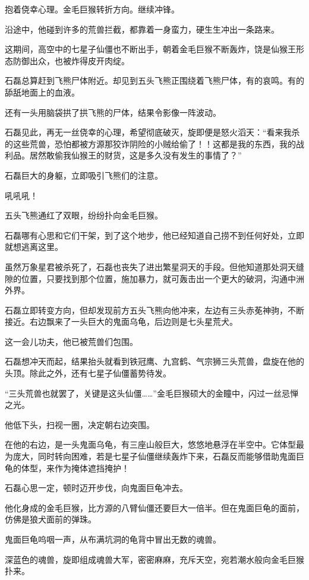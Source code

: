 \begin{this_body}
抱着侥幸心理。金毛巨猴转折方向。继续冲锋。

沿途中，他碰到许多的荒兽拦截，都靠着一身蛮力，硬生生冲出一条路来。

这期间，高空中的七星子仙僵也不断出手，朝着金毛巨猴不断轰炸，饶是仙猴王形态防御出众，也被炸得皮开肉绽。

石磊总算赶到飞熊尸体附近。却见到五头飞熊正围绕着飞熊尸体，有的哀鸣。有的舔舐地面上的血液。

还有一头用脑袋拱了拱飞熊的尸体，结果令影像一阵波动。

石磊见此，再无一丝侥幸的心理，希望彻底破灭，旋即便是怒火滔天：“看来我杀的这些荒兽，恐怕都被方源那狡诈阴险的小贼给偷了！！这都是我的东西，我的战利品。居然敢偷我仙猴王的财货，这是多久没有发生的事情了？”

石磊巨大的身躯，立即吸引飞熊们的注意。

吼吼吼！

五头飞熊通红了双眼，纷纷扑向金毛巨猴。

石磊哪有心思和它们干架，到了这个地步，他已经知道自己捞不到任何好处，立即就想逃离这里。

虽然万象星君被杀死了，石磊也丧失了进出繁星洞天的手段。但他知道那处洞天缝隙的位置，只要找到那个位置，施加暴力，就可轰击出一个更大的破洞，沟通中洲外界。

石磊立即转变方向，但却发现前方五头飞熊向他冲来，左边有三头赤莬神驹，不断接近。右边飘来了一头巨大的鬼面乌龟，后边则是七头星荒犬。

这一会儿功夫，他已被荒兽们包围。

石磊想冲天而起，结果抬头就看到铁冠鹰、九宫鹤、气宗狮三头荒兽，盘旋在他的头顶。除此之外，还有七星子仙僵蓄势待发。

“三头荒兽也就罢了，关键是这头仙僵……”金毛巨猴硕大的金瞳中，闪过一丝忌惮之光。

他低下头，扫视一圈，决定朝右边突围。

在他的右边，是一头鬼面乌龟，有三座山般巨大，悠悠地悬浮在半空中。它体型最为庞大，同时转向困难，若是七星子仙僵继续轰炸下来，石磊反而能够借助鬼面巨龟的体型，来作为掩体遮挡掩护！

石磊心思一定，顿时迈开步伐，向鬼面巨龟冲去。

他化身成的金毛巨猴，比方源的八臂仙僵还要巨大一倍半。但在鬼面巨龟的面前，仿佛是狼犬面前的弹珠。

鬼面巨龟呜咽一声，从布满坑洞的龟背中冒出无数的魂兽。

深蓝色的魂兽，旋即组成魂兽大军，密密麻麻，充斥天空，宛若潮水般向金毛巨猴扑来。


\end{this_body}
